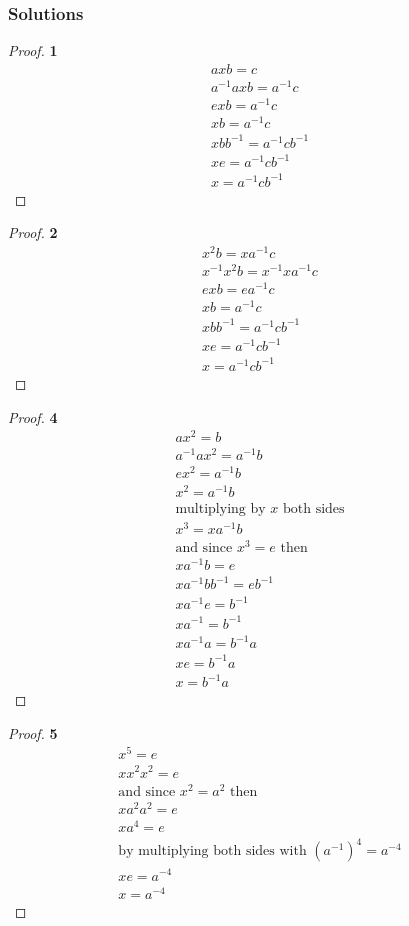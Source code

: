 \documentclass[11pt]{article}
\begin{document}
	\subsubsection*{Solutions}
		\begin{proof}{\textbf{1}}
			\begin{gather*}
				axb=c \\
				a^{-1}axb=a^{-1}c \\
				exb=a^{-1}c \\
				xb=a^{-1}c \\
				xbb^{-1}=a^{-1}cb^{-1} \\
				xe=a^{-1}cb^{-1} \\
				x=a^{-1}cb^{-1}
			\end{gather*}
		\end{proof}
		\begin{proof}{\textbf{2}}
			\begin{gather*}
				x^2b=xa^{-1}c \\
				x^{-1}x^2b=x^{-1}xa^{-1}c \\
				exb=ea^{-1}c \\
				xb=a^{-1}c \\
				xbb^{-1}=a^{-1}cb^{-1} \\
				xe=a^{-1}cb^{-1} \\
				x=a^{-1}cb^{-1}
			\end{gather*}
		\end{proof}
		\begin{proof}{\textbf{4}}
			\begin{gather*}
				ax^2=b \\
				a^{-1}ax^2=a^{-1}b \\
				ex^2=a^{-1}b \\
				x^2=a^{-1}b \\
				\text{multiplying by }x \text{ both sides}\\
				x^3=xa^{-1}b \\
				\text{and since } x^3=e \text{ then}\\
				xa^{-1}b=e \\
				xa^{-1}bb^{-1}=eb^{-1} \\
				xa^{-1}e=b^{-1} \\
				xa^{-1}=b^{-1} \\
				xa^{-1}a=b^{-1}a \\
				xe=b^{-1}a \\
				x=b^{-1}a			
			\end{gather*}
		\end{proof}
		\begin{proof}{\textbf{5}}
			\begin{gather*}
				x^5=e \\
				xx^2x^2=e \\
				\text{and since } x^2=a^2 \text{ then}\\
				xa^2a^2=e \\
				xa^4=e \\
				\text{by multiplying both sides with }(a^{-1})^4=a^{-4} \\
				xe=a^{-4} \\
				x=a^{-4}
			\end{gather*}
		\end{proof}
\cleardoublepage
\end{document}
